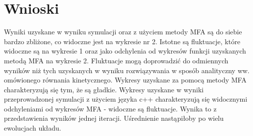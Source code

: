 \documentclass[]{report}
\begin{document}
\section{Wnioski}
Wyniki uzyskane w wyniku symulacji oraz z użyciem metody MFA są do siebie bardzo zbliżone, co widoczne jest na wykresie nr 2. Istotne są fluktuacje, które widoczne są na wykresie 1 oraz jako odchylenia od wykresów funkcji uzyskanych metodą MFA na wykresie 2. Fluktuacje mogą doprowadzić do odmiennych wyników niż tych uzyskanych w wyniku rozwiązywania w sposób analityczny ww. omówionego równania kinetycznego. Wykresy uzyskane za pomocą metody MFA charakteryzują się tym, że są gładkie. Wykresy uzyskane w wyniki przeprowadzonej symulacji z użyciem języka c++ charakteryzują się widocznymi odchyleniami od wykresów MFA - widoczne są fluktuacje. Wynika to z przedstawienia wyników jednej iteracji. Uśrednienie nastąpiłoby po wielu ewolucjach układu. 


 
\end{document}
